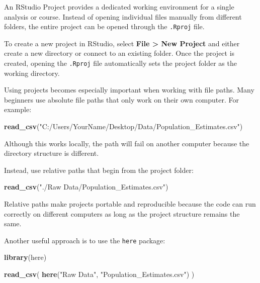 \documentclass[
  11pt,
  oneside]{book}
\newenvironment{Shaded}{\begin{snugshade}}{\end{snugshade}}
\newcommand{\FunctionTok}[1]{\textcolor[rgb]{0.13,0.29,0.53}{\textbf{#1}}}
\newcommand{\NormalTok}[1]{#1}
\newcommand{\StringTok}[1]{\textcolor[rgb]{0.31,0.60,0.02}{#1}}
\begin{document}
An RStudio Project provides a dedicated working environment for a single analysis or course. Instead of opening individual files manually from different folders, the entire project can be opened through the \texttt{.Rproj} file.

To create a new project in RStudio, select \textbf{File \textgreater{} New Project} and either create a new directory or connect to an existing folder. Once the project is created, opening the \texttt{.Rproj} file automatically sets the project folder as the working directory.

Using projects becomes especially important when working with file paths. Many beginners use absolute file paths that only work on their own computer. For example:

\begin{Shaded}
\begin{Highlighting}[]
\FunctionTok{read\_csv}\NormalTok{(}\StringTok{"C:/Users/YourName/Desktop/Data/Population\_Estimates.csv"}\NormalTok{)}
\end{Highlighting}
\end{Shaded}

Although this works locally, the path will fail on another computer because the directory structure is different.

Instead, use relative paths that begin from the project folder:

\begin{Shaded}
\begin{Highlighting}[]
\FunctionTok{read\_csv}\NormalTok{(}\StringTok{"./Raw Data/Population\_Estimates.csv"}\NormalTok{)}
\end{Highlighting}
\end{Shaded}

Relative paths make projects portable and reproducible because the code can run correctly on different computers as long as the project structure remains the same.

Another useful approach is to use the \texttt{here} package:

\begin{Shaded}
\begin{Highlighting}[]
\FunctionTok{library}\NormalTok{(here)}

\FunctionTok{read\_csv}\NormalTok{(}
  \FunctionTok{here}\NormalTok{(}\StringTok{"Raw Data"}\NormalTok{, }\StringTok{"Population\_Estimates.csv"}\NormalTok{)}
\NormalTok{)}
\end{Highlighting}
\end{Shaded}
\end{document}
